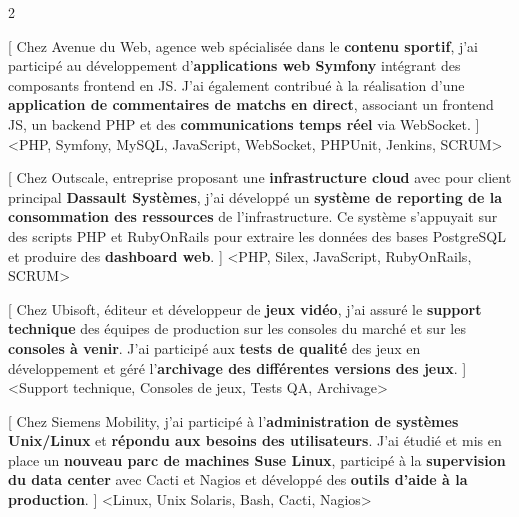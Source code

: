 \begin{paracol}{2}
\begin{leftcolumn}
[
Chez Avenue du Web, agence web spécialisée dans le \textbf{contenu sportif}, j'ai participé au développement
d'\textbf{applications web Symfony} intégrant des composants frontend en JS.
J'ai également contribué à la réalisation d'une \textbf{application de commentaires de matchs en direct}, associant
un frontend JS, un backend PHP et des \textbf{communications temps réel} via WebSocket.
]
<PHP, Symfony, MySQL, JavaScript, WebSocket, PHPUnit, Jenkins, SCRUM>
{}

[
Chez Outscale, entreprise proposant une \textbf{infrastructure cloud} avec pour client principal \textbf{Dassault Systèmes},
j'ai développé un \textbf{système de reporting de la consommation des ressources} de l'infrastructure.
Ce système s'appuyait sur des scripts PHP et RubyOnRails pour extraire les données des bases PostgreSQL et produire des \textbf{dashboard web}.
]
<PHP, Silex, JavaScript, RubyOnRails, SCRUM>
{}

[
Chez Ubisoft, éditeur et développeur de \textbf{jeux vidéo}, j'ai assuré le \textbf{support technique}
des équipes de production sur les consoles du marché et sur les \textbf{consoles à venir}.
J'ai participé aux \textbf{tests de qualité} des jeux en développement et géré l'\textbf{archivage des différentes versions des jeux}.
]
<Support technique, Consoles de jeux, Tests QA, Archivage>
{}

[
Chez Siemens Mobility, j'ai participé à l'\textbf{administration de systèmes Unix/Linux} et \textbf{répondu aux besoins des utilisateurs}. J'ai étudié et mis en place un
\textbf{nouveau parc de machines Suse Linux}, participé à la \textbf{supervision du data center} avec Cacti et Nagios
et développé des \textbf{outils d'aide à la production}.
]
<Linux, Unix Solaris, Bash, Cacti, Nagios>
{}

\vspace{12pt}




\end{leftcolumn}
\end{paracol}
